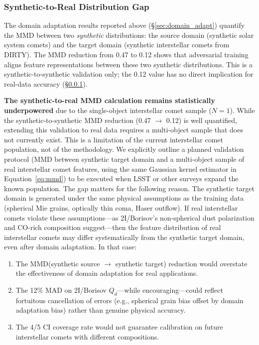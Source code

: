 \documentclass[usenatbib]{mnras}
\begin{document}
\subsubsection{Synthetic-to-Real Distribution Gap}\label{sec:mmd_gap}

The domain adaptation results reported above (\S\ref{sec:domain_adapt}) quantify the MMD between two \textit{synthetic} distributions: the source domain (synthetic solar system comets) and the target domain (synthetic interstellar comets from DIRTY). The MMD reduction from 0.47 to 0.12 shows that adversarial training aligns feature representations between these two synthetic distributions. This is a synthetic-to-synthetic validation only; the 0.12 value has no direct implication for real-data accuracy (\S\ref{sec:mmd_gap}).

\textbf{The synthetic-to-real MMD calculation remains statistically underpowered} due to the single-object interstellar comet sample ($N=1$). While the synthetic-to-synthetic MMD reduction (0.47 $\to$ 0.12) is well quantified, extending this validation to real data requires a multi-object sample that does not currently exist. This is a limitation of the current interstellar comet population, not of the methodology. We explicitly outline a planned validation protocol (MMD between synthetic target domain and a multi-object sample of real interstellar comet features, using the same Gaussian kernel estimator in Equation~\ref{eq:mmd}) to be executed when LSST or other surveys expand the known population. The gap matters for the following reason. The synthetic target domain is generated under the same physical assumptions as the training data (spherical Mie grains, optically thin coma, Haser outflow). If real interstellar comets violate these assumptions---as 2I/Borisov's non-spherical dust polarization \citep{bagnulo21} and CO-rich composition \citep{bodewits20} suggest---then the feature distribution of real interstellar comets may differ systematically from the synthetic target domain, even after domain adaptation. In that case:

\begin{enumerate}
    \item The MMD(synthetic source $\to$ synthetic target) reduction would overstate the effectiveness of domain adaptation for real applications.
    \item The 12\% MAD on 2I/Borisov $Q_d$---while encouraging---could reflect fortuitous cancellation of errors (e.g., spherical grain bias offset by domain adaptation bias) rather than genuine physical accuracy.
    \item The 4/5 CI coverage rate would not guarantee calibration on future interstellar comets with different compositions.
\end{enumerate}
\end{document}
